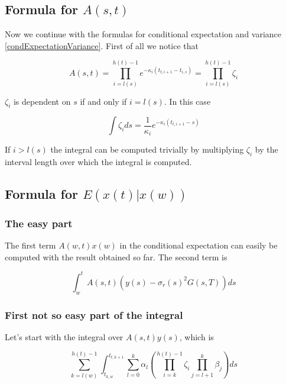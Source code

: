 \documentclass{amsart}
\theoremstyle{plain}
\numberwithin{equation}{section}
\begin{document}
\subsection{Formula for $A(s,t)$}

Now we continue with the formulas for conditional expectation and variance \ref{condExpectationVariance}. First of all we notice that

\begin{equation}
A(s,t) = \prod_{i=l(s)}^{h(t)-1} e^{-\kappa_i(t_{t,i+1}-t_{i,s})} = \prod_{i=l(s)}^{h(t)-1} \zeta_i
\end{equation}

$\zeta_i$ is dependent on $s$ if and only if $i=l(s)$. In this case

\begin{equation}
\int \zeta_i ds = \frac{1}{\kappa_i}e^{-\kappa_i(t_{t,i+1}-s)}
\end{equation}

If $i>l(s)$ the integral can be computed trivially by multiplying $\zeta_i$ by the interval length over which the integral is computed.

\subsection{Formula for $E(x(t)|x(w))$}

\subsubsection{The easy part}

The first term $A(w,t) x(w)$ in the conditional expectation can easily be computed with the result obtained so far. The second term is

\begin{equation}
\int_{w}^t A(s,t) ( y(s)-\sigma_r(s)^2G(s,T))  ds
\end{equation}

\subsubsection{First not so easy part of the integral}

Let's start with the integral over $A(s,t)y(s)$, which is

\begin{equation}
\sum_{k=l(w)}^{h(t)-1} \int_{t_{k,w}}^{t_{t,k+1}} \sum_{l=0}^{k} \alpha_l  \left( \prod_{i=k}^{h(t)-1} \zeta_i \prod_{j=l+1}^{k} \beta_j \right) ds
\end{equation}
\end{document}
